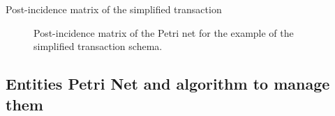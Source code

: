 \documentclass{beamer}
\begin{document}
\begin{frame}{Post-incidence matrix of the simplified transaction}
    \begin{figure}
        \vspace{.2cm}
        \caption{Post-incidence matrix of the Petri net for the example of the simplified transaction schema.}
        \label{Post-esempio1}
    \end{figure}
\end{frame}


\subsection{Entities Petri Net and algorithm to manage them}
\end{document}
